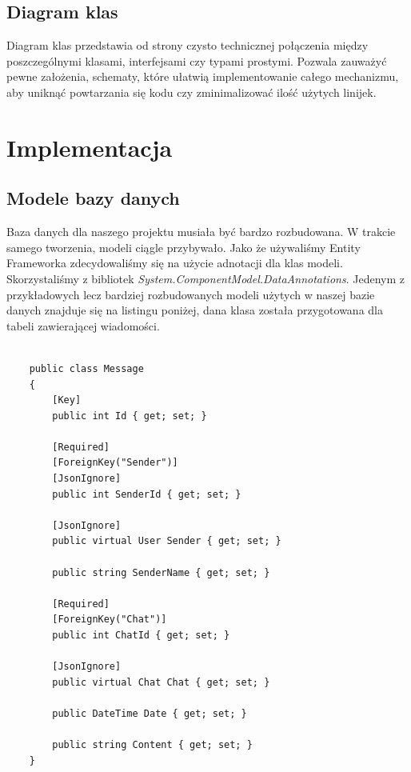 \documentclass[12pt,a4paper]{article}
\begin{document}
\subsection{Diagram klas}
\hspace*{0.7cm} Diagram klas przedstawia od strony czysto technicznej połączenia między poszczególnymi klasami, interfejsami czy typami prostymi. Pozwala zauważyć pewne założenia, schematy, które ułatwią implementowanie całego mechanizmu, aby uniknąć powtarzania się kodu czy zminimalizować ilość użytych linijek. 


\section{Implementacja}

\subsection{Modele bazy danych}				%

\hspace*{0.7cm} Baza danych dla naszego projektu musiała być bardzo rozbudowana. W trakcie samego tworzenia, modeli ciągle przybywało. Jako że używaliśmy Entity Frameworka zdecydowaliśmy się na użycie adnotacji dla klas modeli. Skorzystaliśmy z bibliotek \textit{System.ComponentModel.DataAnnotations}. Jedenym z przykładowych lecz bardziej rozbudowanych modeli użytych w naszej bazie danych znajduje się na listingu poniżej, dana klasa została przygotowana dla tabeli zawierającej wiadomości.\newline

\begin{lstlisting}[caption={Przykładowa klasa modelu tabeli - Message}]

	public class Message
	{
	 	[Key]
	 	public int Id { get; set; }
		
		[Required]
		[ForeignKey("Sender")]
		[JsonIgnore]
		public int SenderId { get; set; }
		
		[JsonIgnore]
		public virtual User Sender { get; set; }
		
		public string SenderName { get; set; }
		
		[Required]
		[ForeignKey("Chat")]
		public int ChatId { get; set; }
		
		[JsonIgnore]
		public virtual Chat Chat { get; set; }
		
		public DateTime Date { get; set; }
		
		public string Content { get; set; }
	}
	
\end{lstlisting}
\end{document}
